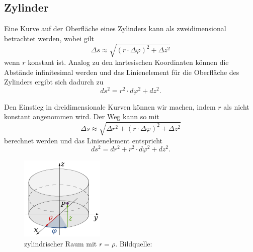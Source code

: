 %
%
%
%
\subsection{Zylinder\label{geodaeten:section:Linienelemente:Zylinder}}

Eine Kurve auf der Oberfläche eines Zylinders kann als zweidimensional betrachtet werden, wobei gilt
\begin{equation}
	\Delta s \approx \sqrt{(r \cdot \Delta \varphi)^2 + \Delta z^2}
\end{equation}
wenn $r$ konstant ist.
Analog zu den kartesischen Koordinaten können die Abstände infinitesimal werden und das Linienelement für die Oberfläche des Zylinders ergibt sich dadurch zu
%
\begin{equation}
	ds^2 = r^2 \cdot d \varphi^2 + d z^2 .
	\label{geodaeten:equation:Linienelemente:Zylinder:equation2}
\end{equation}

Den Einstieg in dreidimensionale Kurven können wir machen, indem $r$ als nicht konstant angenommen wird.
Der Weg kann so mit
\begin{equation}
	\Delta s \approx \sqrt{\Delta r^2 + (r \cdot \Delta \varphi)^2 + \Delta z^2} %
\end{equation}
berechnet werden und das Linienelement entspricht 
\begin{equation}
	ds^2 = d r^2 + r^2 \cdot d \varphi^2 + d z^2 .
	\label{geodaeten:equation:Linienelemente:Zylinder:Zylinder3D}
\end{equation}

\begin{figure}
	\centering
	\includegraphics[width=4cm]{papers/geodaeten/Abbildungen/Linienelemente/LinZyl1}
	\caption{zylindrischer Raum mit $r = \rho$. Bildquelle: \cite{geodaeten:polarkoordinaten}}
	\label{geodaeten:figure:Linienelemente:Zylinder:figure2}
	
\end{figure}
